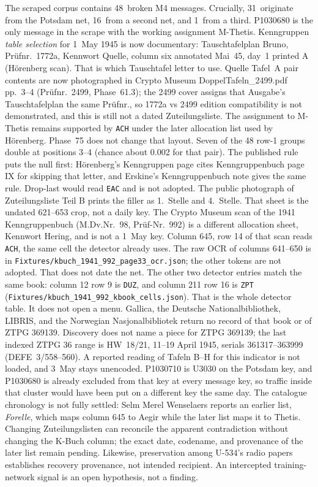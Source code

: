 \documentclass[11pt,a4paper]{article}
\begin{document}
The scraped corpus contains 48~broken M4 messages.
Crucially, 31~originate from the Potsdam net, 16~from a second net, and
1~from a third.
P1030680 is the only message in the scrape with the working assignment
M-Thetis. Kenngruppen \emph{table selection} for 1~May 1945 is now
documentary: Tauschtafelplan Bruno, Prüfnr.\ 1772a, Kennwort Quelle, column
six annotated Mai~45, day~1 printed A (Hörenberg scan). That is which
Tauschtafel letter to use. Quelle Tafel~A pair contents are now photographed
in Crypto Museum DoppelTafeln\_2499.pdf pp.~3--4 (Prüfnr.\ 2499, Phase~61.3);
the 2499 cover assigns that Ausgabe's Tauschtafelplan the same Prüfnr., so
1772a vs 2499 edition compatibility is not demonstrated, and this is still
not a dated Zuteilungsliste. The assignment to M-Thetis remains supported by
\texttt{ACH} under the later allocation list used by Hörenberg.
Phase~75 does not change that layout. Seven of the 48 row-1 groups double
at positions 3--4 (chance about 0.002 for that pair). The published rule puts
the null first: Hörenberg's Kenngruppen page cites Kenngruppenbuch page IX for
skipping that letter, and Erskine's Kenngruppenbuch note gives the same rule.
Drop-last would read \texttt{EAC} and is not adopted. The public
photograph of Zuteilungsliste Teil B prints the filler as 1.\ Stelle and
4.\ Stelle. That sheet is the undated 621--653 crop, not a daily key.
The Crypto Museum scan of the 1941 Kenngruppenbuch (M.Dv.Nr.~98, Prüf-Nr.~992)
is a different allocation sheet, Kennwort Hering, and is not a 1~May key.
Column 645, row 14 of that scan reads \texttt{ACH}, the same cell the
detector already uses. The raw OCR of columns 641--650 is in
\texttt{Fixtures/kbuch\_1941\_992\_page33\_ocr.json}; the other tokens
are not adopted. That does not date the net. The other two
detector entries match the same book: column 12 row 9 is \texttt{DUZ},
and column 211 row 16 is \texttt{ZPT}
(\texttt{Fixtures/kbuch\_1941\_992\_kbook\_cells.json}). That is the
whole detector table. It does not open a menu.
Gallica, the Deutsche Nationalbibliothek, LIBRIS, and the Norwegian
Nasjonalbibliotek return no record of that book or of ZTPG 369139.
Discovery does not name a piece for ZTPG 369139; the last
indexed ZTPG 36 range is HW~18/21, 11--19 April 1945, serials 361317--363999
(DEFE~3/558--560). A reported reading of
Tafeln B--H for this indicator is not loaded, and 3~May stays unencoded.
P1030710 is U3030 on the Potsdam key, and P1030680 is already excluded from
that key at every message key, so traffic inside that cluster would have been
put on a different key the same day. The catalogue chronology is not fully settled: Selm Merel Wenselaers reports an
earlier list, \emph{Forelle}, which maps column 645 to Aegir while the later
list maps it to Thetis. Changing Zuteilungslisten can reconcile the apparent
contradiction without changing the K-Buch column; the exact date, codename, and
provenance of the later list remain pending. Likewise, preservation among
U-534's radio papers establishes recovery provenance, not intended recipient.
An intercepted training-network signal is an open hypothesis, not a finding.
\end{document}
